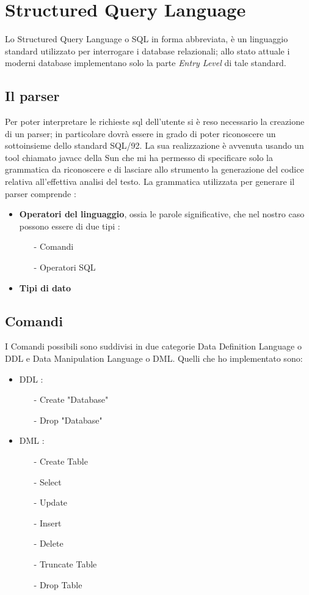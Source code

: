\section{Structured Query Language}

Lo Structured Query Language o SQL in forma abbreviata, è un linguaggio standard utilizzato per interrogare i database relazionali; allo stato attuale i moderni database implementano solo la parte \emph{Entry Level} di tale standard. 

\subsection{Il parser}
Per poter interpretare le richieste sql dell'utente si è reso necessario la creazione di un parser; in particolare dovrà essere in grado di poter riconoscere un sottoinsieme dello standard SQL/92. La sua realizzazione è avvenuta usando un tool chiamato javacc della Sun che mi ha permesso di specificare solo la grammatica da riconoscere e di lasciare allo strumento la generazione del codice relativa all'effettiva analisi del testo. La grammatica utilizzata per generare il parser comprende :
\begin{itemize}
\item {\bf Operatori del linguaggio}, ossia le parole significative, che nel nostro caso possono essere di due tipi : 
\begin{itemize}
\item[-] Comandi
\item[-] Operatori SQL
\end{itemize}
\item {\bf Tipi di dato}
\end{itemize}

\subsection{Comandi}
I Comandi possibili sono suddivisi in due categorie Data Definition Language o DDL e Data Manipulation Language o DML. Quelli che ho implementato sono:
\begin{itemize}
\item DDL :
\begin{itemize}
\item[-] Create "Database"
\item[-] Drop "Database"
\end{itemize}
\item DML :
\begin{itemize}
\item[-] Create Table
\item[-] Select
\item[-] Update
\item[-] Insert 
\item[-] Delete
\item[-] Truncate Table 
\item[-] Drop Table
\end{itemize}
\end{itemize}


